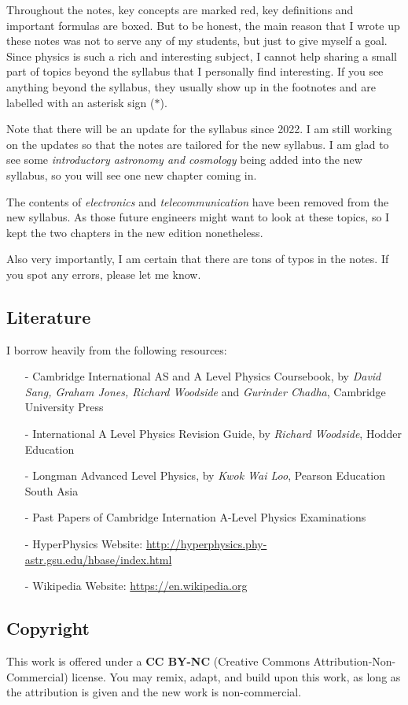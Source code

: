 Throughout the notes, key concepts are marked red, key definitions and important formulas are boxed. But to be honest, the main reason that I wrote up these notes was not to serve any of my students, but just to give myself a goal. Since physics is such a rich and interesting subject, I cannot help sharing a small part of topics beyond the syllabus that I personally find interesting. If you see anything beyond the syllabus, they usually show up in the footnotes and are labelled with an asterisk sign ($\ast$).

Note that there will be an update for the syllabus since 2022. I am still working on the updates so that the notes are tailored for the new syllabus. I am glad to see some \emph{introductory astronomy and cosmology} being added into the new syllabus, so you will see one new chapter coming in.

The contents of \emph{electronics} and \emph{telecommunication} have been removed from the new syllabus. As those future engineers might want to look at these topics, so I kept the two chapters in the new edition nonetheless.

Also very importantly, I am certain that there are tons of typos in the notes. If you spot any errors, please let me know.


\subsection*{Literature}

I borrow heavily from the following resources:

\begin{itemize}
\item[-] Cambridge International AS and A Level Physics Coursebook, by \textit{David Sang, Graham Jones, Richard Woodside} and \textit{Gurinder Chadha}, Cambridge University Press

\item[-] International A Level Physics Revision Guide, by \textit{Richard Woodside}, Hodder Education

\item[-] Longman Advanced Level Physics, by \textit{Kwok Wai Loo},	Pearson Education South Asia

\item[-] Past Papers of Cambridge Internation A-Level Physics Examinations

\item[-] HyperPhysics Website: \url{http://hyperphysics.phy-astr.gsu.edu/hbase/index.html}

\item[-] Wikipedia Website: \url{https://en.wikipedia.org}
\end{itemize}

\subsection*{Copyright}

This work is offered under a \textbf{CC BY-NC} (Creative Commons Attribution-Non-Commercial) license. You may remix, adapt, and build upon this work, as long as the attribution is given and the new work is non-commercial.